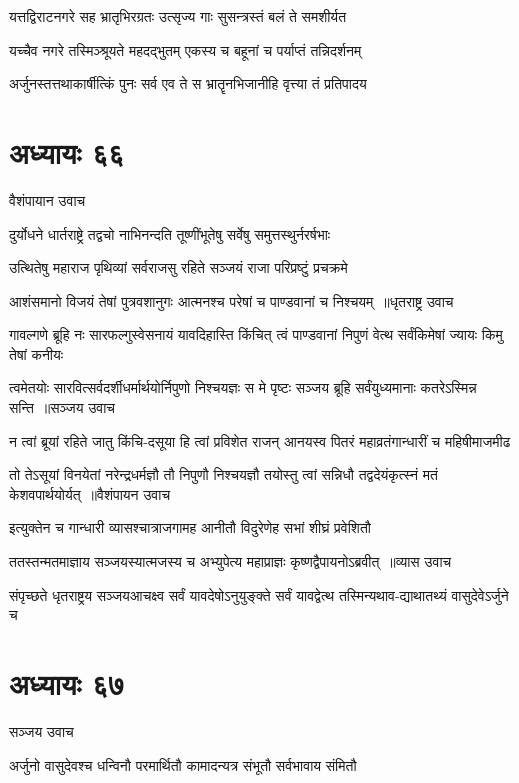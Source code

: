 \twolineshloka
{यत्तद्विराटनगरे सह भ्रातृभिरग्रतः}
{उत्सृज्य गाः सुसन्त्रस्तं बलं ते समशीर्यत}


\twolineshloka
{यच्चैव नगरे तस्मिञ्श्रूयते महदद्भुतम्}
{एकस्य च बहूनां च पर्याप्तं तन्निदर्शनम्}


\twolineshloka
{अर्जुनस्तत्तथाकार्षीत्किं पुनः सर्व एव ते}
{स भ्रातॄनभिजानीहि वृत्त्या तं प्रतिपादय}


\chapter{अध्यायः ६६}
\twolineshloka
{वैशंपायान उवाच}
{}


\twolineshloka
{दुर्योधने धार्तराष्ट्रे तद्वचो नाभिनन्दति}
{तूष्णींभूतेषु सर्वेषु समुत्तस्थुर्नरर्षभाः}


\twolineshloka
{उत्थितेषु महाराज पृथिव्यां सर्वराजसु}
{रहिते सञ्जयं राजा परिप्रष्टुं प्रचक्रमे}


\threelineshloka
{आशंसमानो विजयं तेषां पुत्रवशानुगः}
{आत्मनश्च परेषां च पाण्डवानां च निश्चयम् ॥धृतराष्ट्र उवाच}
{}


\twolineshloka
{गावल्गणे ब्रूहि नः सारफल्गुस्वेसनायं यावदिहास्ति किंचित्}
{त्वं पाण्डवानां निपुणं वेत्थ सर्वंकिमेषां ज्यायः किमु तेषां कनीयः}


\threelineshloka
{त्वमेतयोः सारवित्सर्वदर्शीधर्मार्थयोर्निपुणो निश्चयज्ञः}
{स मे पृष्टः सञ्जय ब्रूहि सर्वंयुध्यमानाः कतरेऽस्मिन्न सन्ति ॥सञ्जय उवाच}
{}


\twolineshloka
{न त्वां ब्रूयां रहिते जातु किंचि-दसूया हि त्वां प्रविशेत राजन्}
{आनयस्व पितरं महाव्रतंगान्धारीं च महिषीमाजमीढ}


\threelineshloka
{तो तेऽसूयां विनयेतां नरेन्द्रधर्मज्ञौ तौ निपुणौ निश्चयज्ञौ}
{तयोस्तु त्वां सन्निधौ तद्वदेयंकृत्स्नं मतं केशवपार्थयोर्यत् ॥वैशंपायन उवाच}
{}


\twolineshloka
{इत्युक्तेन च गान्धारी व्यासश्चात्राजगामह}
{आनीतौ विदुरेणेह सभां शीघ्रं प्रवेशितौ}


\threelineshloka
{ततस्तन्मतमाज्ञाय सञ्जयस्यात्मजस्य च}
{अभ्युपेत्य महाप्राज्ञः कृष्णद्वैपायनोऽब्रवीत् ॥व्यास उवाच}
{}


\twolineshloka
{संपृच्छते धृतराष्ट्रय सञ्जयआचक्ष्व सर्वं यावदेषोऽनुयुङ्क्ते}
{सर्वं यावद्वेत्थ तस्मिन्यथाव-द्याथातथ्यं वासुदेवेऽर्जुने च}


\chapter{अध्यायः ६७}
\twolineshloka
{सञ्जय उवाच}
{}


\twolineshloka
{अर्जुनो वासुदेवश्च धन्विनौ परमार्थितौ}
{कामादन्यत्र संभूतौ सर्वभावाय संमितौ}


